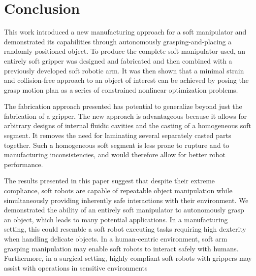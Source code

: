 \section{Conclusion}
\label{sec:conclusion}
This work introduced a new manufacturing approach for a soft manipulator and demonstrated its capabilities through autonomously grasping-and-placing a randomly positioned object.
To produce the complete soft manipulator used, an entirely soft gripper was designed and fabricated and then combined with a previously developed soft robotic arm.
It was then shown that a minimal strain and collision-free approach to an object of interest can be achieved by posing the grasp motion plan as a series of constrained nonlinear optimization problems.

The fabrication approach presented has potential to generalize beyond just the fabrication of a gripper.
The new approach is advantageous because it allows for arbitrary designs of internal fluidic cavities and the casting of a homogeneous soft segment. It removes the need for laminating several separately casted parts together.
Such a homogeneous soft segment is less prone to rupture and to manufacturing inconsistencies, and would therefore allow for better robot performance.

The results presented in this paper suggest that despite their extreme compliance, soft robots are capable of repeatable object manipulation while simultaneously providing inherently safe interactions with their environment.
We demonstrated the ability of an entirely soft manipulator to autonomously grasp an object, which leads to many potential applications.
In a manufacturing setting, this could resemble a soft robot executing tasks requiring high dexterity when handling delicate objects.
In a human-centric environment, soft arm grasping manipulation may enable soft robots to interact safely with humans.
Furthermore, in a surgical setting, highly compliant soft robots with grippers may assist with operations in sensitive environments 

